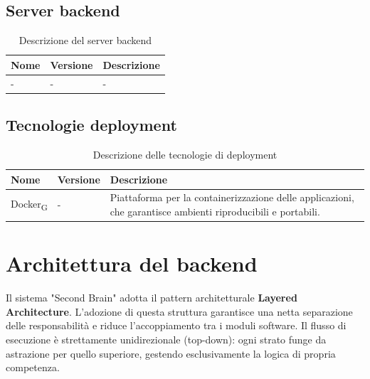 \documentclass[11pt,a4paper]{article}
\newcommand{\gls}[1]{#1\textsubscript{G}}
\begin{document}
\subsection{Server backend}
\begin{table}[H]
    \centering
    \begin{tabular}{|p{}|p{}|p{}|}
        \hline
        \textbf{Nome} & \textbf{Versione} & \textbf{Descrizione} \\
        \hline
        - & - & - \\
        \hline
    \end{tabular}
    \caption{Descrizione del server backend}
    \label{tab:server_backend}
\end{table}

\subsection{Tecnologie deployment}
\begin{table}[H]
    \centering
    \begin{tabular}{|p{}|p{}|p{}|}
        \hline
        \textbf{Nome} & \textbf{Versione} & \textbf{Descrizione} \\
        \hline
        \gls{Docker} & - & Piattaforma per la containerizzazione delle applicazioni, che garantisce ambienti riproducibili e portabili. \\
        \hline
    \end{tabular}
    \caption{Descrizione delle tecnologie di deployment}
    \label{tab:tecnologie_deployment}
\end{table}

\newpage

\section{Architettura del backend}
Il sistema "Second Brain" adotta il pattern architetturale \textbf{Layered Architecture}. L'adozione di questa struttura garantisce una netta separazione delle responsabilità e riduce l'accoppiamento tra i moduli software. Il flusso di esecuzione è strettamente unidirezionale (top-down): ogni strato funge da astrazione per quello superiore, gestendo esclusivamente la logica di propria competenza.
\end{document}

